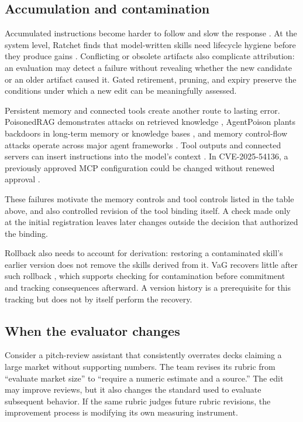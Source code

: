 \subsection{Accumulation and contamination}\label{accumulation-and-contamination}

Accumulated instructions become harder to follow and slow the response \cite{jaroslawicz2025ifscale}. At the system level, Ratchet finds that model-written skills need lifecycle hygiene before they produce gains \cite{zhang2026ratchet}. Conflicting or obsolete artifacts also complicate attribution: an evaluation may detect a failure without revealing whether the new candidate or an older artifact caused it. Gated retirement, pruning, and expiry preserve the conditions under which a new edit can be meaningfully assessed.

Persistent memory and connected tools create another route to lasting error. PoisonedRAG demonstrates attacks on retrieved knowledge \cite{zou2024poisonedrag}, AgentPoison plants backdoors in long-term memory or knowledge bases \cite{chen2024agentpoison}, and memory control-flow attacks operate across major agent frameworks \cite{xu2026mcfa}. Tool outputs and connected servers can insert instructions into the model's context \cite{greshake2023injection, debenedetti2024agentdojo}. In CVE-2025-54136, a previously approved MCP configuration could be changed without renewed approval \cite{checkpoint2025mcpoison}.

These failures motivate the memory controls \cite{su2026chronomem, yu2026rollbackrepair} and tool controls \cite{wallace2024hierarchy} listed in the table above, and also controlled revision of the tool binding itself. A check made only at the initial registration leaves later changes outside the decision that authorized the binding.

Rollback also needs to account for derivation: restoring a contaminated skill's earlier version does not remove the skills derived from it. VaG recovers little after such rollback \cite{shang2026vag}, which supports checking for contamination before commitment and tracking consequences afterward. A version history is a prerequisite for this tracking but does not by itself perform the recovery.

\subsection{When the evaluator changes}\label{sec:reflexive}

Consider a pitch-review assistant that consistently overrates decks claiming a large market without supporting numbers. The team revises its rubric from ``evaluate market size'' to ``require a numeric estimate and a source.'' The edit may improve reviews, but it also changes the standard used to evaluate subsequent behavior. If the same rubric judges future rubric revisions, the improvement process is modifying its own measuring instrument.

